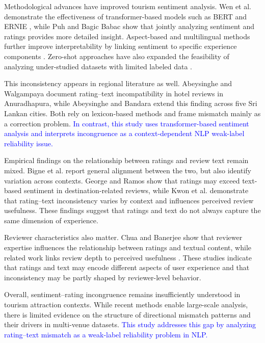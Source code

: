\documentclass[conference]{IEEEtran}
\newcommand{\changed}[1]{\textcolor{blue}{#1}}
\begin{document}
Methodological advances have improved tourism sentiment analysis.
Wen et al. \cite{Wen} demonstrate the effectiveness of transformer-based
models such as BERT \cite{Devlin} and ERNIE \cite{Sun}, while Puh and Bagic Babac \cite{Puh} show
that jointly analyzing sentiment and ratings provides more detailed insight.
Aspect-based and multilingual methods further improve
interpretability by linking sentiment to specific experience components
\cite{Chu2022,Ali}. Zero-shot approaches have also expanded the
feasibility of analyzing under-studied datasets with limited labeled data
\cite{Nawawi}.

This inconsistency appears in regional literature as well. Abeysinghe and Walgampaya \cite{walgampaya} document rating–text incompatibility in hotel reviews in Anuradhapura, while Abeysinghe and Bandara \cite{abeysinghe} extend this finding across five Sri Lankan cities. Both rely on lexicon-based methods and frame mismatch mainly as a correction problem. \changed{In contrast, this study uses transformer-based sentiment analysis and interprets incongruence as a context-dependent NLP weak-label reliability issue.}

Empirical findings on the relationship between ratings and review text remain
mixed. Bigne et al. \cite{Bigne} report general alignment between the two, but also
identify variation across contexts. George and Ramos \cite{George} show that ratings may
exceed text-based sentiment in destination-related reviews, while Kwon et al.
\cite{Kwon} demonstrate that rating--text inconsistency varies by context and
influences perceived review usefulness. These findings suggest that ratings and
text do not always capture the same dimension of experience.

Reviewer characteristics also matter. Chua and Banerjee \cite{Chua} show that
reviewer expertise influences the relationship between ratings and textual
content, while related work links review depth to
perceived usefulness \cite{Chua,Ameur}. These studies indicate that
ratings and text may encode different aspects of user experience and that
inconsistency may be partly shaped by reviewer-level behavior.

Overall, sentiment–rating incongruence remains insufficiently understood in tourism attraction contexts. While recent methods enable large-scale analysis, there is limited evidence on the structure of directional mismatch patterns and their drivers in multi-venue datasets. \changed{This study addresses this gap by analyzing rating–text mismatch as a weak-label reliability problem in NLP.}
\end{document}
